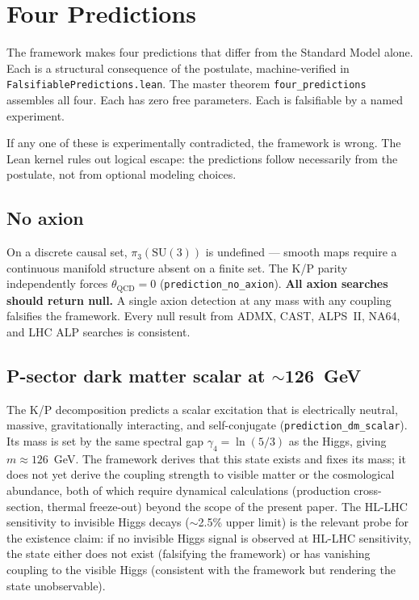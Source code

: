 \documentclass[11pt,letterpaper]{article}
\theoremstyle{remark}
\newcommand{\lean}[1]{\texttt{\small #1}}
\begin{document}
\section{Four Predictions}
\label{sec:predictions}

The framework makes four predictions that differ from the Standard
Model alone. Each is a structural consequence of the postulate,
machine-verified in \lean{FalsifiablePredictions.lean}. The master
theorem \lean{four\_predictions} assembles all four. Each has zero
free parameters. Each is falsifiable by a named experiment.

If any one of these is experimentally contradicted, the framework is
wrong. The Lean kernel rules out logical escape: the predictions
follow necessarily from the postulate, not from optional modeling
choices.

\subsection{No axion}

On a discrete causal set, $\pi_3(\mathrm{SU}(3))$ is undefined ---
smooth maps require a continuous manifold structure absent on a
finite set. The K/P parity independently forces $\theta_{\mathrm{QCD}} =
0$ (\lean{prediction\_no\_axion}). \textbf{All axion searches should
return null.} A single axion detection at any mass with any coupling
falsifies the framework. Every null result from ADMX, CAST, ALPS~II,
NA64, and LHC ALP searches is consistent.

\subsection{P-sector dark matter scalar at $\sim$126~GeV}

The K/P decomposition predicts a scalar excitation that is
electrically neutral, massive, gravitationally interacting, and
self-conjugate (\lean{prediction\_dm\_scalar}). Its mass is set by
the same spectral gap $\gamma_4 = \ln(5/3)$ as the Higgs, giving
$m \approx 126$~GeV. The framework derives that this state exists
and fixes its mass; it does not yet derive the coupling strength to
visible matter or the cosmological abundance, both of which require
dynamical calculations (production cross-section, thermal
freeze-out) beyond the scope of the present paper. The HL-LHC
sensitivity to invisible Higgs decays ($\sim$2.5\% upper limit) is
the relevant probe for the existence claim: if no invisible Higgs
signal is observed at HL-LHC sensitivity, the state either does not
exist (falsifying the framework) or has vanishing coupling to the
visible Higgs (consistent with the framework but rendering the state
unobservable).
\end{document}
